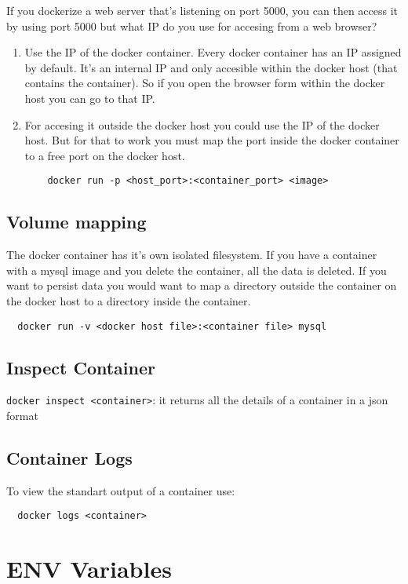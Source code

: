 \documentclass[french]{article}
\begin{document}
If you dockerize a web server that's listening on port 5000, you can then access it by using port 5000 but what IP do you use for accesing from a web browser?
\begin{enumerate}
  \item Use the IP of the docker container. Every docker container has an IP assigned by default. It's an internal IP and only accesible within the docker host (that contains the container). So if you open the browser form within the docker host you can go to that IP.
  \item For accesing it outside the docker host you could use the IP of the docker host. But for that to work you must map the port inside the docker container to a free port on the docker host.
  \begin{verbatim}
    docker run -p <host_port>:<container_port> <image>
  \end{verbatim}
\end{enumerate}

\subsection{Volume mapping}

The docker container has it's own isolated filesystem. If you have a container with a mysql image and you delete the container, all the data is deleted. If you want to persist data you would want to map a directory outside the container on the docker host to a directory inside the container.
\begin{verbatim}
  docker run -v <docker host file>:<container file> mysql
\end{verbatim}

\subsection{Inspect Container}

\verb|docker inspect <container>|: it returns all the details of a container in a json format

\subsection{Container Logs}

To view the standart output of a container use:
\begin{verbatim}
  docker logs <container>
\end{verbatim}

\section{ENV Variables}
\end{document}
